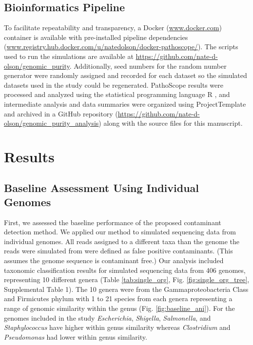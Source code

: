 \documentclass[fleqn,10pt,lineno]{wlpeerj}\usepackage[]{graphicx}\usepackage[]{color}
\begin{document}
\subsection*{Bioinformatics Pipeline}

To facilitate repeatability and transparency, a Docker (\url{www.docker.com}) container is available
with pre-installed pipeline dependencies (\url{www.registry.hub.docker.com/u/natedolson/docker-pathoscope/}).
The scripts used to run the simulations are available at \url{https://github.com/nate-d-olson/genomic_purity}.
Additionally, seed numbers for the random number generator were randomly assigned and recorded for each dataset so the simulated datasets used in the study could be regenerated.
PathoScope results were processed and analyzed using the statistical programming language R \citep{R}, and intermediate analysis and data summaries were organized using ProjectTemplate \citep{ProjectTemplate} and archived in a GitHub repository (\url{https://github.com/nate-d-olson/genomic_purity_analysis}) along with the source files for this manuscript. 


\section*{Results}

\subsection*{Baseline Assessment Using Individual Genomes}

First, we assessed the baseline performance of the proposed contaminant detection method. 
We applied our method to simulated sequencing data from individual genomes. 
All reads assigned to a different taxa than the genome the reads were simulated from were defined as false positive contaminants. 
(This assumes the genome sequence is contaminant free.) 
Our analysis included taxonomic classification results for simulated sequencing data  from 406 genomes, representing 10 different genera (Table \ref{tab:single_org}, Fig. \ref{fig:single_org_tree}, Supplemental Table 1). 
The 10 genera were from the Gammaproteobacteria Class and Firmicutes phylum with 1 to 21 species from each genera representing a range of genomic similarity within the genus (Fig. \ref{fig:baseline_ani}). 
For the genomes included in the study \textit{Escherichia}, \textit{Shigella}, \textit{Salmonella}, and \textit{Staphylococcus} have higher within genus similarity whereas \textit{Clostridium} and \textit{Pseudomonas} had lower within genus similarity. 
\end{document}
